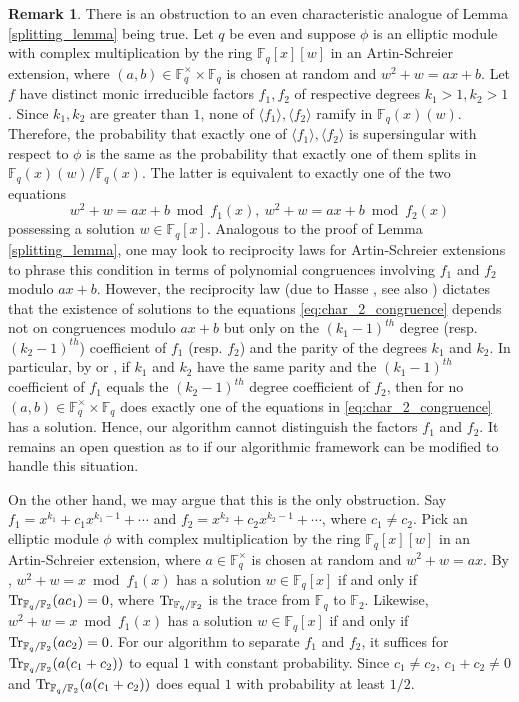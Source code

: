 \documentclass[12pt]{article}
\theoremstyle{definition}
\newtheorem{remark}{Remark}
\def\F{\ensuremath{\mathbb{F}}}
\begin{document}
\begin{remark} \label{rk:obstruction}
There is an obstruction to an even characteristic analogue of Lemma
\ref{splitting_lemma} being true. Let $q$ be even and suppose $\phi$
is an elliptic module with complex multiplication by the ring
$\F_q[x][w]$ in an Artin-Schreier extension, where $(a,b) \in
\F_q^\times \times \F_q$ is chosen at random and $w^2+w=ax+b$. Let $f$
have distinct monic irreducible factors $f_1,f_2$ of respective
degrees $k_1>1,k_2>1$.  Since $k_1,k_2$ are greater than $1$, none of
$\langle f_1\rangle, \langle f_2\rangle$ ramify in
$\F_q(x)(w)$. Therefore, the probability that exactly one of $\langle
f_1\rangle, \langle f_2\rangle$ is supersingular with respect to
$\phi$ is the same as the probability that exactly one of them splits
in $\F_q(x)(w)/\F_q(x)$. The latter is equivalent to exactly one of
the two equations
\begin{equation}\label{eq:char_2_congruence}
  w^2+w = ax+b \bmod f_1(x),\ w^2+w = ax+b \bmod f_2(x)
\end{equation}
possessing a solution $w \in \F_q[x]$. Analogous to the proof of Lemma
\ref{splitting_lemma}, one may look to reciprocity laws for
Artin-Schreier extensions to phrase this condition in terms of
polynomial congruences involving $f_1$ and $f_2$ modulo
$ax+b$. However, the reciprocity law (due to Hasse \cite{Hasse34}, see
also \cite[Theorem 4.2]{Conrad}) dictates that the existence of
solutions to the equations \eqref{eq:char_2_congruence} depends not on
congruences modulo $ax+b$ but only on the $(k_1-1)^{th}$ degree
(resp. $(k_2-1)^{th}$) coefficient of $f_1$ (resp. $f_2$) and the
parity of the degrees $k_1$ and $k_2$. In particular, by
\cite[Theorem~4.2]{Conrad} or \cite[Example~4.1]{Conrad}, if $k_1$ and
$k_2$ have the same parity and the $(k_1-1)^{th}$ coefficient of $f_1$
equals the $(k_2-1)^{th}$ degree coefficient of $f_2$, then for no
$(a,b) \in \F_q^\times \times \F_q$ does exactly one of the equations
in \eqref{eq:char_2_congruence} has a solution. Hence, our algorithm
cannot distinguish the factors $f_1$ and $f_2$. It remains an open
question as to if our algorithmic framework can be modified to handle
this situation. 

On the other hand, we may argue that this is the only obstruction. Say
$f_1 = x^{k_1}+c_1x^{k_1-1}+\cdots$ and $f_2 =
x^{k_2}+c_2x^{k_2-1}+\cdots$, where $c_1 \neq c_2$. Pick an elliptic
module $\phi$ with complex multiplication by the ring $\F_q[x][w]$ in
an Artin-Schreier extension, where $a \in \F_q^\times$ is chosen at
random and $w^2+w=ax$. By \cite[Example 4.1]{Conrad}, $w^2+w = x \bmod
f_1(x)$ has a solution $w \in \F_q[x]$ if and only if
${\rm Tr}_{\F_q/\F_2}(ac_1) = 0$, where ${\rm Tr}_{\F_q/\F_2}$ is the trace from
$\F_q$ to $\F_2$. Likewise, $w^2+w = x \bmod f_1(x)$ has a solution $w
\in \F_q[x]$ if and only if ${\rm Tr}_{\F_q/\F_2}(ac_2) = 0$. For our
algorithm to separate $f_1$ and $f_2$, it suffices for
${\rm Tr}_{\F_q/\F_2}(a(c_1+c_2))$ to equal $1$ with constant
probability. Since $c_1 \neq c_2$, $c_1+c_2 \neq 0$ and
${\rm Tr}_{\F_q/\F_2}(a(c_1+c_2))$ does equal $1$ with probability at least
$1/2$.
\end{remark}
\end{document}
